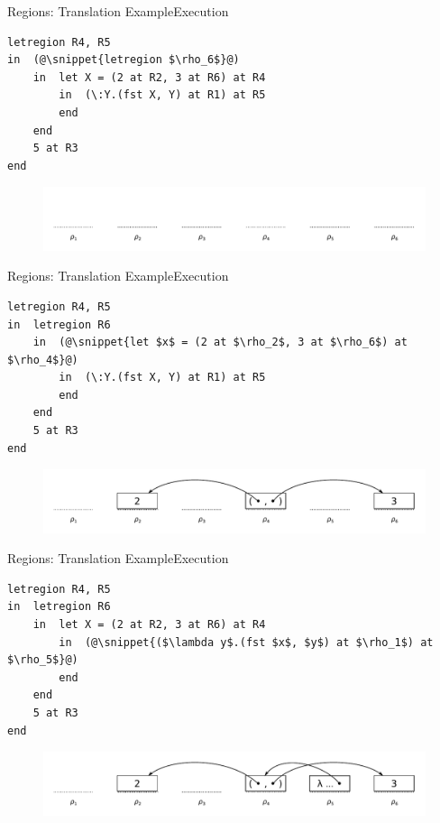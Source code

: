 \documentclass[xcolor=x11names,compress]{beamer}
\newcommand{\snippet}[1] {\textcolor{code}{\texttt{#1}}}
\renewcommand{\(}{\begin{columns}}
\renewcommand{\)}{\end{columns}}
\newcommand{\<}[1]{\begin{column}{#1}}
\renewcommand{\>}{\end{column}}
\begin{document}
\begin{frame}[fragile]{Regions: Translation Example}{Execution}
\begin{lstlisting}
letregion R4, R5
in  (@\snippet{letregion $\rho_6$}@)
    in  let X = (2 at R2, 3 at R6) at R4
        in  (\:Y.(fst X, Y) at R1) at R5
        end
    end
    5 at R3
end
\end{lstlisting}

\begin{figure}[h]
    \includegraphics[width=\textwidth]{regions-2}
\end{figure}
\end{frame}

\begin{frame}[fragile]{Regions: Translation Example}{Execution}
\begin{lstlisting}
letregion R4, R5
in  letregion R6
    in  (@\snippet{let $x$ = (2 at $\rho_2$, 3 at $\rho_6$) at $\rho_4$}@)
        in  (\:Y.(fst X, Y) at R1) at R5
        end
    end
    5 at R3
end
\end{lstlisting}

\begin{figure}[h]
    \includegraphics[width=\textwidth]{regions-3}
\end{figure}
\end{frame}

\begin{frame}[fragile]{Regions: Translation Example}{Execution}
\begin{lstlisting}
letregion R4, R5
in  letregion R6
    in  let X = (2 at R2, 3 at R6) at R4
        in  (@\snippet{($\lambda y$.(fst $x$, $y$) at $\rho_1$) at $\rho_5$}@)
        end
    end
    5 at R3
end
\end{lstlisting}

\begin{figure}[h]
    \includegraphics[width=\textwidth]{regions-4}
\end{figure}
\end{frame}
\end{document}
